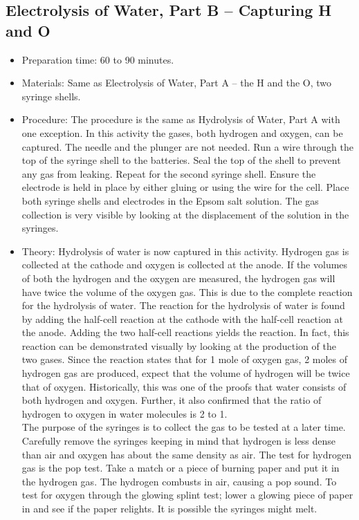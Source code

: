 \subsection{Electrolysis of Water, Part B -- Capturing H and O}
\begin{itemize}
\item{Preparation time: 60 to 90 minutes.}
\item{Materials: Same as Electrolysis of Water, Part A -- the H and the O, two syringe shells.}
\item{Procedure: The procedure is the same as Hydrolysis of Water, Part A with one exception. In this activity the gases, both hydrogen and oxygen, can be captured. The needle and the plunger are not needed. Run a wire through the top of the syringe shell to the batteries. Seal the top of the shell to prevent any gas from leaking. Repeat for the second syringe shell. Ensure the electrode is held in place by either gluing or using the wire for the cell. Place both syringe shells and electrodes in the Epsom salt solution. The gas collection is very visible by looking at the displacement of the solution in the syringes.}
\item{Theory: Hydrolysis of water is now captured in this activity. Hydrogen gas is collected at the cathode and oxygen is collected at the anode. If the volumes of both the hydrogen and the oxygen are measured, the hydrogen gas will have twice the volume of the oxygen gas. This is due to the complete reaction for the hydrolysis of water. The reaction for the hydrolysis of water is found by adding the half-cell reaction at the cathode with the half-cell reaction at the anode. Adding the two half-cell reactions yields the reaction. In fact, this reaction can be demonstrated visually by looking at the production of the two gases. Since the reaction states that for 1 mole of oxygen gas, 2 moles of hydrogen gas are produced, expect that the volume of hydrogen will be twice that of oxygen. Historically, this was one of the proofs that water consists of both hydrogen and oxygen. Further, it also confirmed that the ratio of hydrogen to oxygen in water molecules is 2 to 1.\\
The purpose of the syringes is to collect the gas to be tested at a later time. Carefully remove the syringes keeping in mind that hydrogen is less dense than air and oxygen has about the same density as air. The test for hydrogen gas is the pop test. Take a match or a piece of burning paper and put it in the hydrogen gas. The hydrogen combusts in air, causing a pop sound. To test for oxygen through the glowing splint test; lower a glowing piece of paper in and see if the paper relights. It is possible the syringes might melt.}
\end{itemize}

